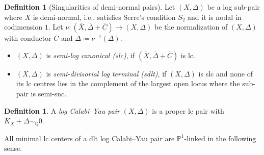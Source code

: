 \documentclass{amsart}
\theoremstyle{definition}
\newtheorem{defn}[theorem]{Definition}
\theoremstyle{remark}
\def\bQ{\mathbb{Q}}
\def\bP{\mathbb{P}}
\numberwithin{equation}{section}
\begin{document}
\begin{defn}[Singularities of demi-normal pairs]
Let $(X, \Delta)$ be a log sub-pair where $X$ is demi-normal, i.e., satisfies Serre's condition $S_2$ and it is nodal in codimension $1$. Let $\nu \colon (\overline{X}, \overline{\Delta}+\overline{C}) \to (X, \Delta)$ be the normalization of $(X, \Delta)$ with conductor $\overline{C}$ and $\overline{\Delta} \coloneqq  \nu^{-1}(\Delta)$.
\begin{itemize}
\item $(X, \Delta)$ is 
\emph{semi-log canonical (slc)}, if $(\overline{X}, \overline{\Delta}+\overline{C})$ is lc.
\item $(X, \Delta)$ is 
\emph{semi-divisorial log terminal (sdlt)}, if $(X, \Delta)$ is slc and none of
its lc centres lies in the complement of the largest open locus where the sub-pair is semi-snc.
\end{itemize}
\end{defn}

\begin{defn}
A \emph{log Calabi--Yau pair} $(X, \Delta)$ is a proper lc pair with $K_X + \Delta \sim_{\bQ} 0$.
\end{defn}

All minimal lc centers of a dlt log Calabi--Yau pair are $\bP^1$-linked in the following sense. 
\end{document}
